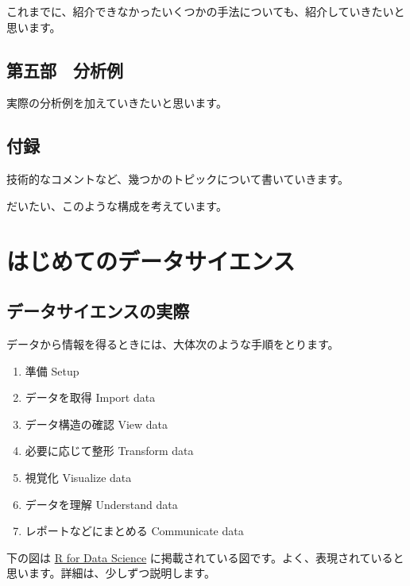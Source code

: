 \documentclass[
  xelatex, ja=standard]{bxjsbook}
\providecommand{\tightlist}{%
  \setlength{\itemsep}{0pt}\setlength{\parskip}{0pt}}
\theoremstyle{definition}
\theoremstyle{definition}
\theoremstyle{definition}
\theoremstyle{definition}
\theoremstyle{remark}
\begin{document}
これまでに、紹介できなかったいくつかの手法についても、紹介していきたいと思います。

\hypertarget{ux7b2cux4e94ux90e8-ux5206ux6790ux4f8b}{%
\section{第五部　分析例}\label{ux7b2cux4e94ux90e8-ux5206ux6790ux4f8b}}

実際の分析例を加えていきたいと思います。

\hypertarget{ux4ed8ux9332}{%
\section{付録}\label{ux4ed8ux9332}}

技術的なコメントなど、幾つかのトピックについて書いていきます。

だいたい、このような構成を考えています。

\hypertarget{first-example}{%
\chapter{はじめてのデータサイエンス}\label{first-example}}

\hypertarget{ux30c7ux30fcux30bfux30b5ux30a4ux30a8ux30f3ux30b9ux306eux5b9fux969b}{%
\section{データサイエンスの実際}\label{ux30c7ux30fcux30bfux30b5ux30a4ux30a8ux30f3ux30b9ux306eux5b9fux969b}}

データから情報を得るときには、大体次のような手順をとります。

\begin{enumerate}
\def\labelenumi{\arabic{enumi}.}
\tightlist
\item
  準備 Setup
\item
  データを取得 Import data
\item
  データ構造の確認 View data
\item
  必要に応じて整形 Transform data
\item
  視覚化 Visualize data
\item
  データを理解 Understand data
\item
  レポートなどにまとめる Communicate data
\end{enumerate}

下の図は \href{https://r4ds.hadley.nz}{R for Data Science} に掲載されている図です。よく、表現されていると思います。詳細は、少しずつ説明します。
\end{document}

